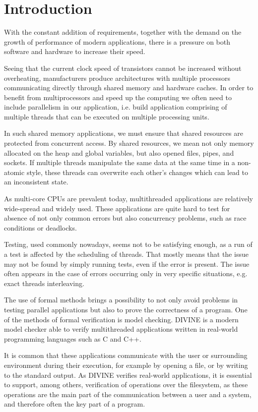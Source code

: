 \chapter{Introduction} \label{chap:intro}

With the constant addition of requirements, together with the demand on the growth of performance of modern applications, there is a pressure on both software and hardware to increase their speed.

 Seeing that the current clock speed of transistors cannot be increased without overheating, manufacturers produce architectures with multiple processors communicating directly through shared memory and hardware caches. In order to benefit from multiprocessors and speed up the computing we often need to include parallelism in our application, i.e. build application comprising of multiple threads that can be executed on multiple processing units.

In such shared memory applications, we must ensure that shared resources are protected from concurrent access. By shared resources, we mean not only memory allocated on the heap and global variables, but also opened files, pipes, and sockets. If multiple threads manipulate the same data at the same time in a non-atomic style, these threads can overwrite each other's changes which can lead to an inconsistent state.

As multi-core CPUs are prevalent today, multithreaded applications are relatively wide-spread and widely used. These applications are quite hard to test for absence of not only common errors but also concurrency problems, such as race conditions or deadlocks. 

Testing, used commonly nowadays, seems not to be satisfying enough, as a run of a test is affected by the scheduling of threads. That mostly means that the issue may not be found by simply running tests, even if the error is present. The issue often appears in the case of errors occurring only in very specific situations, e.g. exact threads interleaving.

The use of formal methods brings a possibility to not only avoid problems in testing parallel applications but also to prove the correctness of a program. One of the methods of formal verification is model checking. DIVINE is a modern model checker able to verify multithreaded applications written in real-world programming languages such as C and C++. 

It is common that these applications communicate with the user or surrounding environment during their execution, for example by opening a file, or by writing to the standard output. As DIVINE verifies real-world applications, it is essential to support, among others, verification of operations over the filesystem, as these operations are the main part of the communication between a user and a system, and therefore often the key part of a program.

